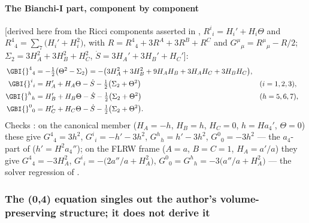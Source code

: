 \paragraph{The Bianchi-I part, component by component} [derived here from the Ricci components asserted
in , $R^i{}_i=H_i'+H_i\Theta$ and $R^4{}_4=\sum_7\bigl(H_i'+H_i^2\bigr)$, with
$R=R^4{}_4+3R^A+3R^B+R^C$ and $G^\mu{}_\mu=R^\mu{}_\mu-R/2$; $\Sigma_2=3H_A^2+3H_B^2+H_C^2$,
$\dot S=3H_A'+3H_B'+H_C'$]:
\begin{align*}
  \GBI{}^4{}_4&=-\tfrac12\bigl(\Theta^2-\Sigma_2\bigr)=-\bigl(3H_A^2+3H_B^2+9H_AH_B+3H_AH_C+3H_BH_C\bigr),\\
  \GBI{}^i{}_i&=H_A'+H_A\Theta-\dot S-\tfrac12\bigl(\Sigma_2+\Theta^2\bigr) &&(i=1,2,3),\\
  \GBI{}^h{}_h&=H_B'+H_B\Theta-\dot S-\tfrac12\bigl(\Sigma_2+\Theta^2\bigr) &&(h=5,6,7),\\
  \GBI{}^0{}_0&=H_C'+H_C\Theta-\dot S-\tfrac12\bigl(\Sigma_2+\Theta^2\bigr).
\end{align*}
Checks \cfderived: on the canonical member ($H_A=-h$, $H_B=h$, $H_C=0$, $h=Ha_4'$, $\Theta=0$) these give
$G^4{}_4=3h^2$, $G^i{}_i=-h'-3h^2$, $G^h{}_h=h'-3h^2$, $G^0{}_0=-3h^2$ --- the $a_4$-part of
 ($h'=H^2a_4''$); on the FLRW frame ($A=a$, $B=C=1$, $H_A=a'/a$) they give
$G^4{}_4=-3H_A^2$, $G^i{}_i=-\bigl(2a''/a+H_A^2\bigr)$, $G^0{}_0=G^h{}_h=-3\bigl(a''/a+H_A^2\bigr)$ --- the
solver regression of .

\subsubsection{The (0,4) equation singles out the author's volume-preserving structure; it does not derive it}
\label{sec:4.3.2}

